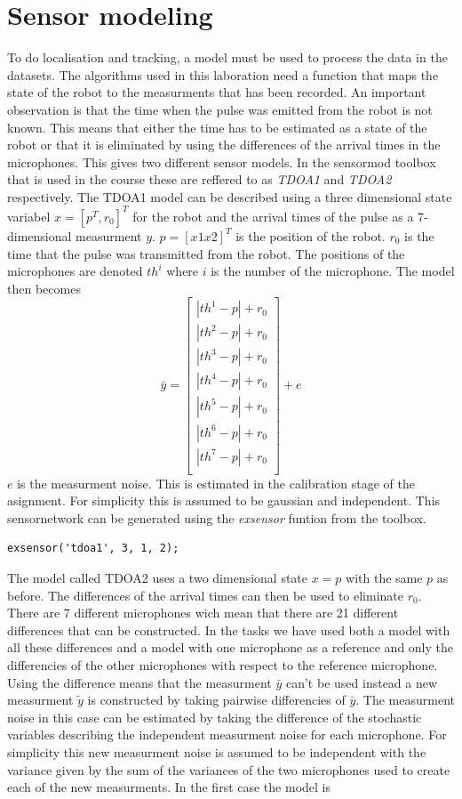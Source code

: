 \documentclass[10pt,a4paper]{report}
\begin{document}
\section{Sensor modeling}
\label{Sensor modeling}
To do localisation and tracking, a model must be used to process the data in the datasets.
The algorithms used in this laboration need a function that maps the state of the robot to the measurments that has been recorded.
An important observation is that the time when the pulse was emitted from the robot is not known.
This means that either the time has to be estimated as a state of the robot or that it is eliminated by using the differences of the arrival times in the microphones.
This gives two different sensor models.
In the sensormod toolbox that is used in the course these are reffered to as \emph{TDOA1} and \emph{TDOA2} respectively.
The TDOA1 model can be described using a three dimensional state variabel $x = [p^T, r_0]^T$ 
for the robot and the arrival times of the pulse as a 7-dimensional measurment $y$.
$p = [x1 x2]^T$ is the position of the robot. $r_0$ is the time that the pulse was transmitted from the robot.
The positions of the microphones are denoted $th^i$ where $i$ is the number of the microphone.
The model then becomes
\[
  \bar{y} = 
  \begin{bmatrix}
    |th^1 - p| + r_0 \\ 
    |th^2 - p| + r_0 \\ 
    |th^3 - p| + r_0 \\ 
    |th^4 - p| + r_0 \\ 
    |th^5 - p| + r_0 \\ 
    |th^6 - p| + r_0 \\ 
    |th^7 - p| + r_0 \\ 
  \end{bmatrix} + e
\]
$e$ is the measurment noise. This is estimated in the calibration stage of the asignment.
For simplicity this is assumed to be gaussian and independent.
This sensornetwork can be generated using the \emph{exsensor} funtion from the toolbox.
\begin{verbatim}
exsensor('tdoa1', 3, 1, 2);
\end{verbatim}

The model called TDOA2 uses a two dimensional state $x = p$ with the same $p$ as before.
The differences of the arrival times can then be used to eliminate $r_0$.
There are 7 different microphones wich mean that there are 21 different differences that can be constructed.
In the tasks we have used both a model with all these differences and 
a model with one microphone as a reference and only the differencies of the other microphones with respect to the reference microphone.
Using the difference means that the measurment $\bar{y}$ can't be used instead a new measurment $\tilde{y}$ is constructed by taking pairwise differencies of $\bar{y}$.
The measurment noise in this case can be estimated by taking the difference of the stochastic variables describing the independent measurment noise for each microphone.
For simplicity this new measurment noise is assumed to be independent with the variance given by the sum of the variances of the two microphones used to create each of the new measurments.
In the first case the model is
\end{document}
